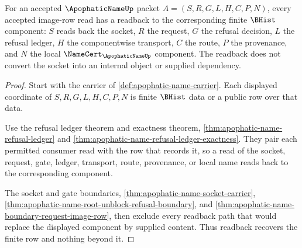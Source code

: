 \begin{theorem}
\label{thm:apophatic-name-refusal-readback-row}
For an accepted $\ApophaticNameUp$ packet $A=(S,R,G,L,H,C,P,N)$, every accepted image-row read has a readback to the corresponding finite $\BHist$ component: $S$ reads back the socket, $R$ the request, $G$ the refusal decision, $L$ the refusal ledger, $H$ the componentwise transport, $C$ the route, $P$ the provenance, and $N$ the local $\NameCert_{\ApophaticNameUp}$ component. The readback does not convert the socket into an internal object or supplied dependency.
\end{theorem}
\begin{proof}
Start with the carrier of \autoref{def:apophatic-name-carrier}. Each displayed coordinate of $S,R,G,L,H,C,P,N$ is finite $\BHist$ data or a public row over that data.

Use the refusal ledger theorem and exactness theorem, \autoref{thm:apophatic-name-refusal-ledger} and \autoref{thm:apophatic-name-refusal-ledger-exactness}. They pair each permitted consumer read with the row that records it, so a read of the socket, request, gate, ledger, transport, route, provenance, or local name reads back to the corresponding component.

The socket and gate boundaries, \autoref{thm:apophatic-name-socket-carrier}, \autoref{thm:apophatic-name-root-unblock-refusal-boundary}, and \autoref{thm:apophatic-name-boundary-request-image-row}, then exclude every readback path that would replace the displayed component by supplied content. Thus readback recovers the finite row and nothing beyond it.
\end{proof}

